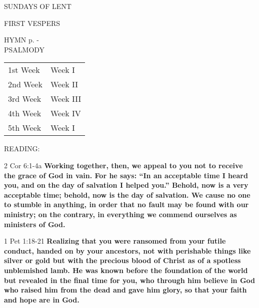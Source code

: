\begin{center}\normalsize{SUNDAYS OF LENT}\\
\end{center}

\begin{flushleft}\normalsize{\uppercase{FIRST VESPERS\\}}\end{flushleft}
\noindent\small{\uppercase{HYMN} p. \pageref{lent:firstHymn}-\pageref{lent:lastHymn}\\}
\noindent\small{\uppercase{PSALMODY}}
\begin{center}
\begin{tabular}{ l l }
1st Week & Week I\\
2nd Week & Week II\\
3rd Week & Week III\\
4th Week & Week IV\\
5th Week & Week I\\
\end{tabular}
\end{center}

\noindent\small{\uppercase{READING:}}
\begin{description}[labelindent=\parindent, leftmargin=*]
\item [Weeks 1-4:]    2 Cor 6:1-4a    \textbf{Working together, then, we appeal to you not to receive the grace of God in vain. For he says: “In an acceptable time I heard you, and on the day of salvation I helped you.” Behold, now is a very acceptable time; behold, now is the day of salvation. We cause no one to stumble in anything, in order that no fault may be found with our ministry; on the contrary, in everything we commend ourselves as ministers of God.\\}
\item [Week 5:]    1 Pet 1:18-21    \textbf{Realizing that you were ransomed from your futile conduct, handed on by your ancestors, not with perishable things like silver or gold but with the precious blood of Christ as of a spotless unblemished lamb. He was known before the foundation of the world but revealed in the final time for you, who through him believe in God who raised him from the dead and gave him glory, so that your faith and hope are in God.}
\end{description}

